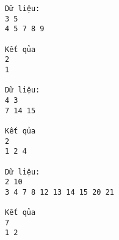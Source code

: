 \begin{verbatim}
Dữ liệu:
3 5
4 5 7 8 9

Kết qủa
2 
1

Dữ liệu:
4 3
7 14 15

Kết qủa
2
1 2 4

Dữ liệu:
2 10
3 4 7 8 12 13 14 15 20 21

Kết qủa
7
1 2
\end{verbatim}